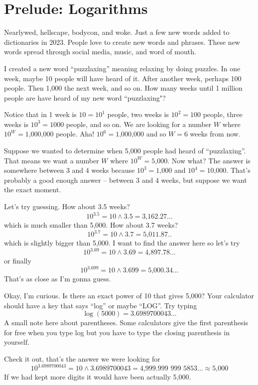 \section{Prelude: Logarithms}

Nearlywed, hellscape, bodycon, and woke.  Just a few new words added to dictionaries in 2023.  People love to create new words and phrases.  These new words spread through social media, music, and word of mouth.

I created a new word ``puzzlaxing'' meaning relaxing by doing puzzles. In one week, maybe 10 people will have heard of it.  After another week, perhaps 100 people.  Then 1,000 the next week, and so on.  How many weeks until 1 million people are have heard of my new word ``puzzlaxing"?

Notice that in 1 week is $10 = 10^1$ people, two weeks is $10^2 = 100$ people, three weeks is $10^3=1000$ people, and so on.  We are looking for a number $W$ where $10^W=\text{1,000,000}$ people.  Aha!  $10^6=\text{1,000,000}$ and so $W=6$ weeks from now.

Suppose we wanted to determine when 5,000 people had heard of ``puzzlaxing''.  That means we want a number $W$ where $10^W = \text{5,000}$.  Now what?  The answer is somewhere between 3 and 4 weeks because $10^3=\text{1,000}$ and $10^4=\text{10,000}$.  That's probably a good enough answer -- between 3 and 4 weeks, but suppose we want the exact moment. 

Let's try guessing.  How about 3.5 weeks? 
$$10^{3.5} =10 \wedge 3.5 = \text{3,162.27...} $$ 
which is much smaller than 5,000.  How about 3.7 weeks? 
$$10^{3.7} =10 \wedge 3.7 = \text{5,011.87..} $$ 
which is slightly bigger than 5,000.  I want to find the answer here so let's try 
$$10^{3.69}=10 \wedge 3.69= \text{4,897.78...}$$ 
or finally 
$$10^{3.699}=10 \wedge 3.699= \text{5,000.34...}$$ 
That's as close as I'm gonna guess. 

Okay, I'm curious. Is there an exact power of 10 that gives 5,000?  Your calculator should have a key that says ``log'' or maybe ``LOG''.  Try typing $$\log(5000)=  3.6989700043...$$
A small note here about parentheses.  Some calculators give the first parenthesis for free when you type log but you have to type the closing parenthesis in yourself.  

Check it out, that's the answer we were looking for 
$$10^{3.6989700043} =10 \wedge 3.6989700043 = \text{4,999.999~999~5853...} \approx \text{5,000}$$
If we had kept more digits it would have been actually 5,000.

